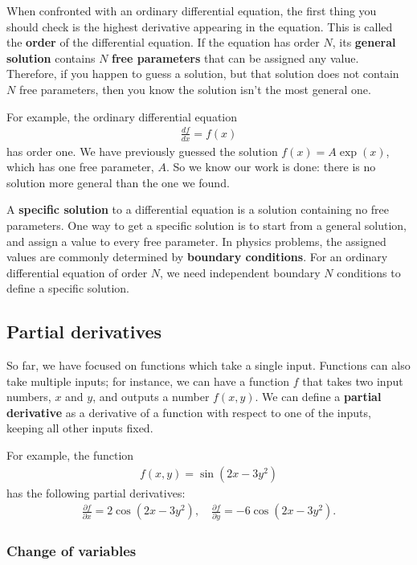 \documentclass[10pt,a4paper]{article}
\begin{document}
When confronted with an ordinary differential equation, the first
thing you should check is the highest derivative appearing in the
equation.  This is called the \textbf{order} of the differential
equation.  If the equation has order $N$, its \textbf{general
  solution} contains $N$ \textbf{free parameters} that can be assigned
any value. Therefore, if you happen to guess a solution, but that
solution does not contain $N$ free parameters, then you know the
solution isn't the most general one.

For example, the ordinary differential equation
\begin{align}
  \frac{df}{dx} = f(x)
\end{align}
has order one. We have previously guessed the solution $f(x) = A
\exp(x)$, which has one free parameter, $A$.  So we know our work is
done: there is no solution more general than the one we found.

A \textbf{specific solution} to a differential equation is a solution
containing no free parameters.  One way to get a specific solution is
to start from a general solution, and assign a value to every free
parameter. In physics problems, the assigned values are commonly
determined by \textbf{boundary conditions}. For an ordinary
differential equation of order $N$, we need independent boundary $N$
conditions to define a specific solution.

\subsection{Partial derivatives}
\label{partial-derivatives}

So far, we have focused on functions which take a single
input. Functions can also take multiple inputs; for instance, we can
have a function $f$ that takes two input numbers, $x$ and $y$, and
outputs a number $f(x,y)$. We can define a \textbf{partial derivative}
as a derivative of a function with respect to one of the inputs,
keeping all other inputs fixed.

For example, the function
\begin{align}
  f(x,y) = \sin(2x - 3 y^2)
\end{align}
has the following partial derivatives:
\begin{align}
  \frac{\partial f}{\partial x} = 2\cos(2x-3y^2), \quad
  \frac{\partial f}{\partial y} = - 6\cos(2x-3y^2).
\end{align}

\subsubsection{Change of variables}
\label{change-of-variables}
\end{document}

